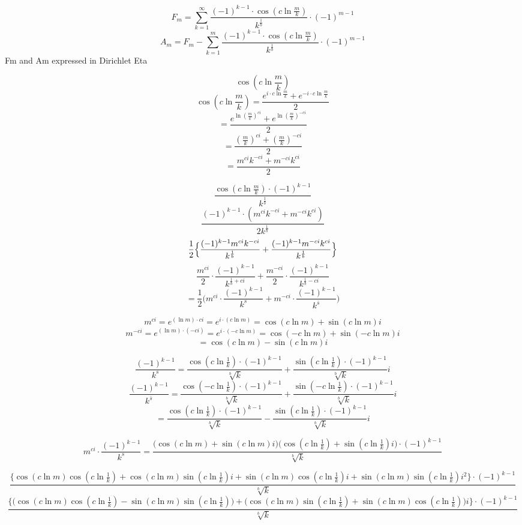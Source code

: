 \documentclass{amsart}
\begin{document}
	\[ F_m = \sum\limits_{k=1}^{\infty} \frac{(-1)^{k-1} {\cdot} \cos(c \ln \frac{m}{k})}{k^{\frac{1}{b}}} {\cdot} (-1)^{m-1} \]
	\[ A_m = F_m - \sum\limits_{k=1}^{m} \frac{(-1)^{k-1} {\cdot} \cos(c \ln \frac{m}{k})}{k^{\frac{1}{b}}} {\cdot} (-1)^{m-1} \]
	\[\]
	Fm and Am expressed in Dirichlet Eta
	
	\[ \cos(c \ln \frac{m}{k}) \]
	\[ \cos(c \ln \frac{m}{k}) = \frac{e^{i \cdot c \ln \frac{m}{k}} + e^{-i \cdot c \ln \frac{m}{k}}}{2} \]
	\[ = \frac{e^{\ln (\frac{m}{k})^{ci}} + e^{\ln (\frac{m}{k})^{-ci}}}{2} \]
	\[ = \frac{(\frac{m}{k})^{ci} + (\frac{m}{k})^{-ci}}{2} \]
	\[ = \frac{m^{ci}k^{-ci} + m^{-ci}k^{ci}}{2} \]
	
	\[ \frac{\cos(c \ln \frac{m}{k}) \cdot (-1)^{k-1}}{k^{\frac{1}{b}}} \]
	\[ \frac{ (-1)^{k-1} {\cdot} (m^{ci}k^{-ci} + m^{-ci}k^{ci}) }{2k^{\frac{1}{b}}} \]
	\[ \frac{1}{2} \Bigl\{ \frac{ (-1)^{k-1}m^{ci}k^{-ci}  }{k^{\frac{1}{b}}} + \frac{ (-1)^{k-1}m^{-ci}k^{ci}  }{k^{\frac{1}{b}}}  \Bigr\} \]
	\[ \frac{m^{ci}}{2} {\cdot} \frac{(-1)^{k-1}}{k^{\frac{1}{b}+ci}} + \frac{m^{-ci}}{2} {\cdot} \frac{(-1)^{k-1}}{k^{\frac{1}{b}-ci}} \]
	\[ = \frac{1}{2} \Big( m^{ci} {\cdot} \frac{(-1)^{k-1}}{k^{s}} + m^{-ci} {\cdot} \frac{(-1)^{k-1}}{k^{\bar{s}}}   \Big) \]
	
	\[ m^{ci} =  e^{(\ln m){\cdot}ci} = e^{i{\cdot}(c\ln m)} = \cos(c \ln m) + \sin(c \ln m) i \]
	\[ m^{-ci} =  e^{(\ln m){\cdot}(-ci)} = e^{i{\cdot}(-c\ln m)} = \cos(-c \ln m) + \sin(-c \ln m) i \]
	\[ = \cos(c \ln m) - \sin(c \ln m) i  \]
	
	\[ \frac{(-1)^{k-1}}{k^s} = \frac{\cos(c \ln \frac{1}{k}){\cdot}(-1)^{k-1}}{\sqrt[b]{k}} + \frac{\sin(c \ln \frac{1}{k}){\cdot}(-1)^{k-1}}{\sqrt[b]{k}} i \]
	\[ \frac{(-1)^{k-1}}{k^{\bar{s}}} = \frac{\cos(-c \ln \frac{1}{k}){\cdot}(-1)^{k-1}}{\sqrt[b]{k}} + \frac{\sin(-c \ln \frac{1}{k}){\cdot}(-1)^{k-1}}{\sqrt[b]{k}} i \]
	\[ = \frac{\cos(c \ln \frac{1}{k}){\cdot}(-1)^{k-1}}{\sqrt[b]{k}} - \frac{\sin(c \ln \frac{1}{k}){\cdot}(-1)^{k-1}}{\sqrt[b]{k}} i \]
	
	\[ m^{ci} {\cdot} \frac{(-1)^{k-1}}{k^s} = \frac{\Big( \cos(c \ln m) {+} \sin(c \ln m) i \Big) \Big(\cos(c \ln \frac{1}{k}) {+} \sin(c \ln \frac{1}{k})i \Big) {\cdot} (-1)^{k-1} }{\sqrt[b]{k}} \]
	
	\[ \frac{ \Big\{ \cos(c \ln m)\cos(c \ln \frac{1}{k}) {+} \cos(c \ln m)\sin(c \ln \frac{1}{k})i {+} \sin(c \ln m)\cos(c \ln \frac{1}{k})i {+} \sin(c \ln m)\sin(c \ln \frac{1}{k})i^2 \Big\} {\cdot} (-1)^{k-1} }{\sqrt[b]{k}}   \]
	\[ \frac{ \Big\{ \Big( \cos(c \ln m)\cos(c \ln \frac{1}{k}) - \sin(c \ln m)\sin(c \ln \frac{1}{k}) \Big) {+} \Big( \cos(c \ln m)\sin(c \ln \frac{1}{k}) {+} \sin(c \ln m)\cos(c \ln \frac{1}{k}) \Big)i \Big\} {\cdot} (-1)^{k-1} }{\sqrt[b]{k}}   \]
	
\end{document}
